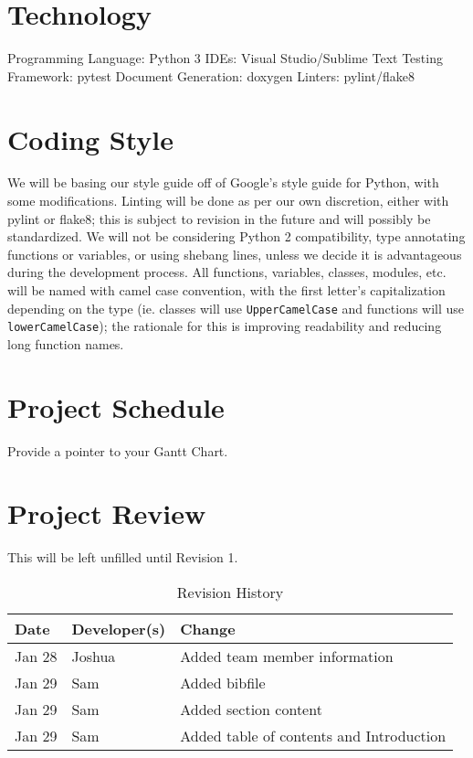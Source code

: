 \documentclass{article}
\begin{document}
\section{Technology}
Programming Language: Python 3
IDEs: Visual Studio/Sublime Text
Testing Framework: pytest
Document Generation: doxygen
Linters: pylint/flake8

\section{Coding Style}
We will be basing our style guide off of Google’s style guide for Python, with 
some modifications. Linting will be done as per our own discretion, either with 
pylint or flake8; this is subject to revision in the future and will possibly be 
standardized. We will not be considering Python 2 compatibility, type annotating 
functions or variables, or using shebang lines, unless we decide it is 
advantageous during the development process. All functions, variables, classes, 
modules, etc. will be named with camel case convention, with the first letter’s 
capitalization depending on the type (ie. classes will use 
\texttt{UpperCamelCase} and functions will use \texttt{lowerCamelCase}); the 
rationale for this is improving readability and reducing long function names.

\section{Project Schedule}
Provide a pointer to your Gantt Chart.

\section{Project Review}
This will be left unfilled until Revision 1.

\printbibliography{}

\begin{table}[h]
\caption{Revision History} \label{TblRevisionHistory}
\begin{tabularx}{\textwidth}{llX}
\toprule
\textbf{Date} & \textbf{Developer(s)} & \textbf{Change}\\
\midrule
Jan 28 & Joshua & Added team member information\\
Jan 29 & Sam & Added bibfile\\
Jan 29 & Sam & Added section content\\
Jan 29 & Sam & Added table of contents and Introduction\\
\bottomrule
\end{tabularx}
\end{table}
\end{document}
